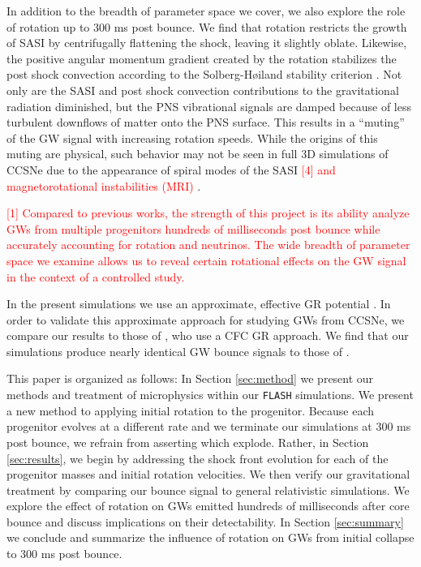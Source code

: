 \documentclass[twocolumn,times]{aastex62}  %
\begin{document}


In addition to the breadth of parameter space we cover, we also explore the role of rotation up to 300 ms post bounce.  
We find that rotation restricts the growth of SASI by centrifugally flattening the shock, leaving it slightly oblate. Likewise, the positive angular momentum gradient created by the rotation stabilizes the post shock convection according to the Solberg-H{\o}iland stability criterion \citep{endal:1978,fryer:2000}.  Not only are the SASI and post shock convection contributions to the gravitational radiation diminished, but the PNS vibrational signals are damped because of less turbulent downflows of matter onto the PNS surface.  
This results in a ``muting'' of the GW signal with increasing rotation speeds.
While the origins of this muting are physical, such behavior may not be seen in full 3D simulations of CCSNe due to the appearance of spiral modes of the SASI \textcolor{red}{[4] and magnetorotational instabilities (MRI)} \citep{andresen:2018,cerda-duran:2007} . 

\textcolor{red}{[1] Compared to previous works, the strength of this project is its ability analyze GWs from multiple progenitors hundreds of milliseconds post bounce while accurately accounting for rotation and neutrinos.  The wide breadth of parameter space we examine allows us to reveal certain rotational effects on the GW signal in the context of a controlled study.}

In the present simulations we use an approximate, effective GR potential \citep{marek:2006,oconnor:2018}.
In order to validate this approximate approach for studying GWs from CCSNe, we compare our results to those of \citet{richers:2017}, who use a CFC GR approach.  We find that our simulations produce nearly identical GW bounce signals to those of \citet{richers:2017}.  

This paper is organized as follows:  In Section \ref{sec:method} we present our methods and treatment of microphysics within our \texttt{FLASH} simulations.  We present a new method to applying initial rotation to the progenitor.  Because each progenitor evolves at a different rate and we terminate our simulations at 300 ms post bounce, we refrain from asserting which explode.  Rather, in Section \ref{sec:results}, we begin by addressing the shock front evolution for each of the progenitor masses and initial rotation velocities.  We then verify our gravitational treatment by comparing our bounce signal to general relativistic simulations.  We explore the effect of rotation on GWs emitted hundreds of milliseconds after core bounce and discuss implications on their detectability.  In Section \ref{sec:summary} we conclude and summarize the influence of rotation on GWs from initial collapse to 300 ms post bounce. 
\end{document}
